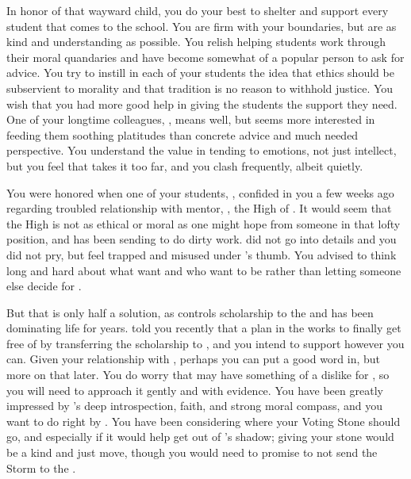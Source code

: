 \documentclass[char]{GL2020}
\begin{document}
In honor of that wayward child, you do your best to shelter and support every student that comes to the school. You are firm with your boundaries, but are as kind and understanding as possible. You relish helping students work through their moral quandaries and have become somewhat of a popular person to ask for advice. You try to instill in each of your students the idea that ethics should be subservient to morality and that tradition is no reason to withhold justice. You wish that you had more good help in giving the students the support they need. One of your longtime colleagues, \cMusic{\full}, means well, but seems more interested in feeding them soothing platitudes than concrete advice and much needed perspective. You understand the value in tending to emotions, not just intellect, but you feel that \cMusic{} takes it too far, and you clash frequently, albeit quietly.

You were honored when one of your students, \cScholarship{\full}, confided in you a few weeks ago regarding \cScholarship{\their} troubled relationship with \cScholarship{\their} mentor, \cAntiChup{\full}, the High \cAntiChup{\Cleric} of \cTechGod{}. It would seem that the High \cAntiChup{\Cleric} is not as ethical or moral as one might hope from someone in that lofty position, and has been sending \cScholarship{} to do \cAntiChup{\their} dirty work. \cScholarship{} did not go into details and you did not pry, but \cScholarship{\they} feel\cScholarship{\verbs} trapped and misused under \cAntiChup{}’s thumb. You advised \cScholarship{} to think long and hard about what \emph{\cScholarship{\they}} want\cScholarship{\verbs} and who \emph{\cScholarship{\they}} want\cScholarship{\verbs} to be rather than letting someone else decide for \cScholarship{\them}. 

But that is only half a solution, as \cAntiChup{} controls \cScholarship{\their} scholarship to the \pSchool{} and has been dominating \cScholarship{\their} life for years. \cScholarship{} told you recently that \cScholarship{\they} \cScholarship{\have} a plan in the works to finally get free of \cAntiChup{} by transferring the scholarship to \cBeetle{\full}, and you intend to support \cScholarship{\them} however you can. Given your relationship with \cBeetle{}, perhaps you can put a good word in, but more on that later. You do worry that \cBeetle{} may have something of a dislike for \cScholarship{}, so you will need to approach it gently and with evidence. You have been greatly impressed by \cScholarship{}’s deep introspection, faith, and strong moral compass, and you want to do right by \cScholarship{\them}. You have been considering where your Voting Stone should go, and especially if it would help \cScholarship{\them} get out of \cAntiChup{}’s shadow; giving \cScholarship{\them} your stone would be a kind and just move, though you would need \cScholarship{} to promise to not send the Storm to the \pShip{}.
\end{document}
